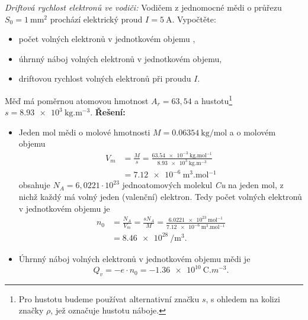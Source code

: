 \begin{mdframed}[style=mdexam]
\begin{example}\label{TEO:exam008} \emph{Driftová rychlost elektronů ve vodiči:} Vodičem z 
jednomocné mědi o
  průřezu $S_0 = \SI{1}{\mm^2}$ prochází elektrický proud $I = \SI{5}{\A}$. Vypočtěte:
  \begin{itemize}[noitemsep, leftmargin=2em]
    \item počet volných elektronů v jednotkovém objemu ,
    \item úhrnný náboj volných elektronů v jednotkovém objemu,
    \item driftovou rychlost volných elektronů při proudu \(I\).
  \end{itemize}
  Měď má poměrnou atomovou hmotnost $A_r = 63,54$ a hustotu\footnote{Pro hustotu budeme používat 
  alternativní značku $s$, s ohledem na kolizi značky $\rho$, jež označuje hustotu náboje.} $s = 
  \SI{8.93e3}{\kg.\m^{-3}}$.\newline  
  \textbf{Řešení:}
  \begin{itemize}[leftmargin=2em]
    \item Jeden mol mědi o molové hmotnosti $M = \SI{0.06354}{\kg\per\mol}$ a o molovém
          objemu 
          \begin{align*}
            V_m &= \frac{M}{s} 
                 = \frac{\SI{63.54e-3}{\kg.\mol^{-1}}}{\SI{8.93e3}{\kg.\m^{-3}}}      \\
                &= \SI{7.12e-6}{\m^3.\mol^{-1}}
          \end{align*}
          obsahuje $N_A = 6,0221\cdot10^{23}$ jednoatomových molekul \emph{Cu} na jeden mol,
          z nichž každý má volný jeden (valenční) elektron. Tedy počet volných elektronů v
          jednotkovém objemu je 
          \begin{align*}
            n_0 &= \frac{N_A}{V_m} = \frac{sN_A}{M}                                           
                 = \frac{\SI{6.0221e23}{\mol^{-1}}}{\SI{7.12e-6}{\m^{3}.\mol^{-1}}}    \\
                &= \SI{8.46e28}{\per\cubic\m}.
          \end{align*}  
    \item Úhrnný náboj volných elektronů v jednotkovém objemu mědi je 
          \begin{equation}
            Q_v = -e\cdot n_0 = \SI{-1.36e10}{\coulomb.m^{-3}}.
          \end{equation}

\end{itemize}
\end{example}
\end{mdframed}
